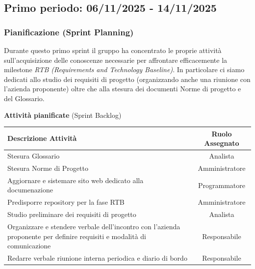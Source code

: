 \documentclass[a4paper, 11pt, oneside]{scrartcl} %
\begin{document}
\subsection{Primo periodo: 06/11/2025 - 14/11/2025}

\subsubsection*{Pianificazione (Sprint Planning)}

Durante questo primo sprint il gruppo ha concentrato le proprie attività
sull’acquisizione delle conoscenze necessarie per affrontare efficacemente la milestone \textit{RTB (Requirements and Technology Baseline)}.  
In particolare ci siamo dedicati allo studio dei requisiti di progetto (organizzando anche una riunione con l'azienda proponente) oltre che alla stesura dei documenti Norme di progetto e del Glossario.

\begin{table}[!ht]
\vspace{0.2cm}
\centering
{\large \textbf{Attività pianificate} (Sprint Backlog)} \\
\vspace{0.3cm}
\renewcommand{\arraystretch}{1.4}
\begin{tabularx}{\textwidth}{|X|c|} 
\hline
\rowcolor{white} 
\textbf{Descrizione Attività} & \textbf{Ruolo Assegnato} \\
\hline
Stesura Glossario & Analista \\
Stesura Norme di Progetto & Amministratore \\
Aggiornare e sistemare sito web dedicato alla documenazione & Programmatore \\
Predisporre repository per la fase RTB & Amministratore \\
Studio preliminare dei requisiti di progetto & Analista \\
Organizzare e stendere verbale dell'incontro con l'azienda proponente per definire requisiti e modalità di comunicazione & Responsabile  \\
Redarre verbale riunione interna periodica e diario di bordo & Responsabile \\
\hline
\end{tabularx}
\end{table}
\FloatBarrier
\end{document}
